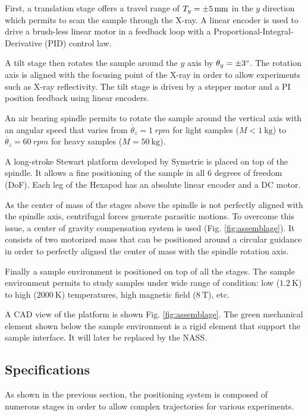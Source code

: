 \documentclass[a4paper, keeplastbox, biblatex]{jacow}
\begin{document}
First, a translation stage offers a travel range of \(T_y = \SI{\pm5}{\milli\metre}\) in the \(y\) direction which permits to scan the sample through the X-ray.
A linear encoder is used to drive a brush-less linear motor in a feedback loop with a Proportional-Integral-Derivative (PID) control law.

A tilt stage then rotates the sample around the \(y\) axis by \(\theta_y = \ang{\pm3}\). The rotation axis is aligned with the focusing point of the X-ray in order to allow experiments such as X-ray reflectivity.
The tilt stage is driven by a stepper motor and a PI position feedback using linear encoders.

An air bearing spindle permits to rotate the sample around the vertical axis with an angular speed that varies from \(\dot{\theta_z} = \SI{1}{rpm}\) for light samples (\(M<\SI{1}{\kilo\gram}\)) to \(\dot{\theta_z} = \SI{60}{rpm}\) for heavy samples (\(M=\SI{50}{\kilo\gram}\)).

A long-stroke Stewart platform developed by Symetrie is placed on top of the spindle. It allows a fine positioning of the sample in all 6 degrees of freedom (DoF). Each leg of the Hexapod has an absolute linear encoder and a DC motor.

As the center of mass of the stages above the spindle is not perfectly aligned with the spindle axis, centrifugal forces generate parasitic motions.
To overcome this issue, a center of gravity compensation system is used (Fig. \ref{fig:assemblage}). It consists of two motorized mass that can be positioned around a circular guidance in order to perfectly aligned the center of mass with the spindle rotation axis.

Finally a sample environment is positioned on top of all the stages. The sample environment permits to study samples under wide range of condition: low (\(\SI{1.2}{\kelvin}\)) to high (\(\SI{2000}{\kelvin}\)) temperatures, high magnetic field (\(\SI{8}{\tesla}\)), etc.

A CAD view of the platform is shown Fig. \ref{fig:assemblage}. The green mechanical element shown below the sample environment is a rigid element that support the sample interface. It will later be replaced by the NASS.

\subsection{Specifications}
\label{sec:org050f06e}
As shown in the previous section, the positioning system is composed of numerous stages in order to allow complex trajectories for various experiments.
\end{document}
